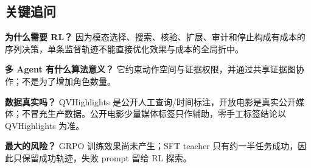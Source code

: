 \documentclass[UTF8,letterpaper,10pt,twocolumn]{ctexart}
\begin{document}
\subsection{关键追问}

\textbf{为什么需要 RL？} 因为模态选择、搜索、核验、扩展、审计和停止构成有成本的序列决策，单条监督轨迹不能直接优化效果与成本的全局折中。

\textbf{多 Agent 有什么算法意义？} 它约束动作空间与证据权限，并通过共享证据图协作；不是为了增加角色数量。

\textbf{数据真实吗？} QVHighlights 是公开人工查询/时间标注，开放电影是真实公开媒体；不冒充生产数据。公开电影少量媒体标签只作辅助，零手工标签结论以 QVHighlights 为准。

\textbf{最大的风险？} GRPO 训练效果尚未产生；SFT teacher 只有约一半任务成功，因此只保留成功轨迹，失败 prompt 留给 RL 探索。
\end{document}
